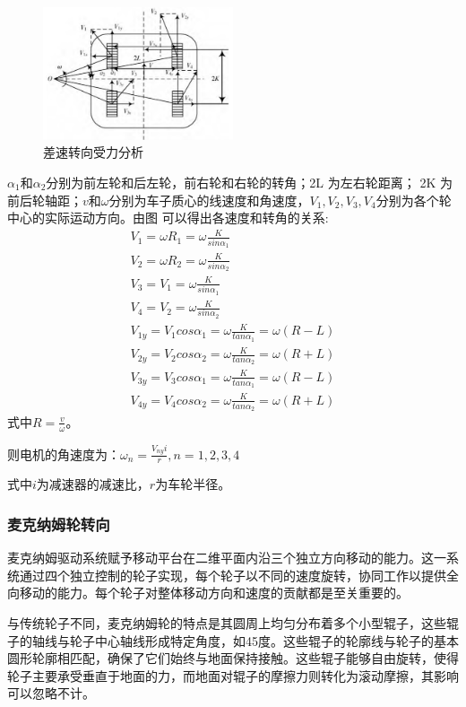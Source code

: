 \documentclass{report}
\begin{document}
\begin{figure}[ht]
  \centering
  \includegraphics[width=0.5\textwidth]{figures/chasu.png}
  \caption{差速转向受力分析}
\end{figure}
\newpage
$\alpha_1$和$\alpha_2$分别为前左轮和后左轮，前右轮和右轮的转角；2L 为左右轮距离； 2K 为前后轮轴距；$v$和$\omega$分别为车子质心的线速度和角速度，$V_1,V_2,V_3,V_4$分别为各个轮中心的实际运动方向。由图 可以得出各速度和转角的关系:
\[\begin{gathered}
V_{1}=\omega R_{1}=\omega\frac{K}{sin\alpha_{1}}\\
V_{2}=\omega R_{2}=\omega\frac{K}{sin\alpha_{2}} \\
V_{3}=V_{1}=\omega\frac{K}{sin\alpha_{1}} \\
V_{4}=V_{2}=\omega\frac{K}{sin\alpha_{2}}\\
V_{1y}=V_{1}cos\alpha_{1}= \omega\frac{K}{tan\alpha_{1}}=\omega(R-L)\\
V_{2y}=V_{2}cos\alpha_{2}= \omega\frac{K}{tan\alpha_{2}}=\omega(R+L)\\
V_{3y}=V_{3}cos\alpha_{1}= \omega\frac{K}{tan\alpha_{1}}=\omega(R-L)\\
V_{4y}=V_{4}cos\alpha_{2}= \omega\frac{K}{tan\alpha_{2}}=\omega(R+L)
\end{gathered}\]
式中$R=\frac v\omega $。

则电机的角速度为：$\omega_n=\frac{V_{ny}i}r,n=1,2,3,4$

式中$i$为减速器的减速比，$r$为车轮半径。


\subsubsection{麦克纳姆轮转向\cite{mac}}
\label{subsec:label}
麦克纳姆驱动系统赋予移动平台在二维平面内沿三个独立方向移动的能力。这一系统通过四个独立控制的轮子实现，每个轮子以不同的速度旋转，协同工作以提供全向移动的能力。每个轮子对整体移动方向和速度的贡献都是至关重要的。

与传统轮子不同，麦克纳姆轮的特点是其圆周上均匀分布着多个小型辊子，这些辊子的轴线与轮子中心轴线形成特定角度，如45度。这些辊子的轮廓线与轮子的基本圆形轮廓相匹配，确保了它们始终与地面保持接触。这些辊子能够自由旋转，使得轮子主要承受垂直于地面的力，而地面对辊子的摩擦力则转化为滚动摩擦，其影响可以忽略不计。
\end{document}
